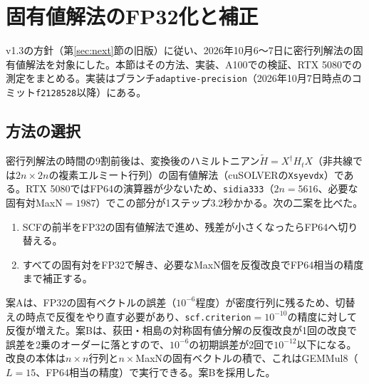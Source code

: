 \documentclass[a4paper,11pt]{ltjsarticle}
\newcommand{\code}[1]{\texttt{#1}}
\begin{document}
\section{固有値解法のFP32化と補正}\label{sec:eig}
v1.3の方針（第\ref{sec:next}節の旧版）に従い、2026年10月6〜7日に密行列解法の固有値解法を対象にした。本節はその方法、実装、A100での検証、RTX 5080での測定をまとめる。実装はブランチ\code{adaptive-precision}（2026年10月7日時点のコミット\code{f2128528}以降）にある。

\subsection{方法の選択}
密行列解法の時間の9割前後は、変換後のハミルトニアン$\tilde H=X^{\dagger}H_tX$（非共線では$2n\times2n$の複素エルミート行列）の固有値解法（cuSOLVERの\code{Xsyevdx}）である。RTX 5080ではFP64の演算器が少ないため、\code{sidia333}（$2n=5616$、必要な固有対MaxN$=1987$）でこの部分が1ステップ3.2秒かかる。次の二案を比べた。
\begin{enumerate}
\item[案A] SCFの前半をFP32の固有値解法で進め、残差が小さくなったらFP64へ切り替える。
\item[案B] すべての固有対をFP32で解き、必要なMaxN個を反復改良でFP64相当の精度まで補正する。
\end{enumerate}
案Aは、FP32の固有ベクトルの誤差（$10^{-6}$程度）が密度行列に残るため、切替えの時点で反復をやり直す必要があり、\code{scf.criterion}$=10^{-10}$の精度に対して反復が増えた。案Bは、荻田・相島の対称固有値分解の反復改良\cite{ogita2018,ogita2019}が1回の改良で誤差を2乗のオーダーに落とすので、$10^{-6}$の初期誤差が2回で$10^{-12}$以下になる。改良の本体は$n\times n$行列と$n\times$MaxNの固有ベクトルの積で、これはGEMMul8（$L=15$、FP64相当の精度）で実行できる。案Bを採用した。
\end{document}
